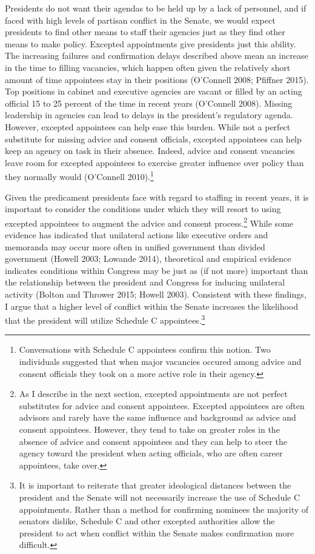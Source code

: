 \documentclass[12pt]{article}
\begin{document}
Presidents do not want their agendas to be held up by a lack of personnel, and if faced with high levels of partisan conflict in the Senate, we would expect presidents to find other means to staff their agencies just as they find other means to make policy. Excepted appointments give presidents just this ability. The increasing failures and confirmation delays described above mean an increase in the time to filling vacancies, which happen often given the relatively short amount of time appointees stay in their positions (O'Connell 2008; Pfiffner 2015). Top positions in cabinet and executive agencies are vacant or filled by an acting official 15 to 25 percent of the time in recent years (O'Connell 2008). Missing leadership in agencies can lead to delays in the president's regulatory agenda. However, excepted appointees can help ease this burden. While not a perfect substitute for missing advice and consent officials, excepted appointees can help keep an agency on task in their absence. Indeed, advice and consent vacancies leave room for excepted appointees to exercise greater influence over policy than they normally would (O'Connell 2010).\footnote{Conversations with Schedule C appointees confirm this notion. Two individuals suggested that when major vacancies occured among advice and consent officials they took on a more active role in their agency.}

Given the predicament presidents face with regard to staffing in recent years, it is important to consider the conditions under which they will resort to using excepted appointees to augment the advice and consent process.\footnote{As I describe in the next section, excepted appointments are not perfect substitutes for advice and consent appointees. Excepted appointees are often advisors and rarely have the same influence and background as advice and consent appointees. However, they tend to take on greater roles in the absence of advice and consent appointees and they can help to steer the agency toward the president when acting officials, who are often career appointees, take over.} While some evidence has indicated that unilateral actions like executive orders and memoranda may occur more often in unified government than divided government (Howell 2003; Lowande 2014), theoretical and empirical evidence indicates conditions within Congress may be just as (if not more) important than the relationship between the president and Congress for inducing unilateral activity (Bolton and Thrower 2015; Howell 2003). Consistent with these findings, I argue that a higher level of conflict within the Senate increases the likelihood that the president will utilize Schedule C appointees.\footnote{It is important to reiterate that greater ideological distances between the president and the Senate will not necessarily increase the use of Schedule C appointments. Rather than a method for confirming nominees the majority of senators dislike, Schedule C and other excepted authorities allow the president to act when conflict within the Senate makes confirmation more difficult.} 
\end{document}

